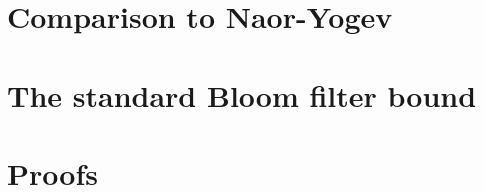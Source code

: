 \documentclass{article}
\begin{document}



\newpage

\begin{appendix}
  \section{Comparison to Naor-Yogev}
  

  \section{The standard Bloom filter bound}
  

  \section{Proofs}
%  
\end{appendix}


%
\end{document}
